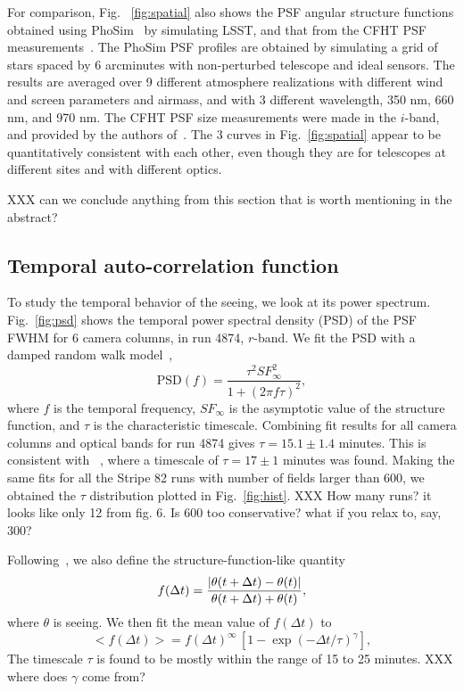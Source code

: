 For comparison, Fig. ~\ref{fig:spatial} also shows the PSF angular
structure functions obtained using PhoSim~\citep{phosim} by simulating LSST,
and that from the CFHT PSF measurements~\citep{heymans2012}.
The PhoSim PSF profiles are obtained by simulating a grid of stars
spaced by 6 arcminutes with non-perturbed telescope and ideal sensors.
The results are averaged over 9 different atmosphere realizations with
different wind and screen parameters and airmass, and with 3 different
wavelength, 350 nm, 660 nm, and 970 nm.
The CFHT PSF size measurements were made in the $i$-band, and provided
by the authors of~\cite{heymans2012}.
The 3 curves in Fig.~\ref{fig:spatial} appear to be quantitatively
consistent with each other, even though they are for telescopes at
different sites and with different optics.

XXX can we conclude anything from this section that is worth mentioning in the abstract? 


\subsection{Temporal auto-correlation function}

To study the temporal behavior of the seeing, we look at its
 power spectrum.
Fig.~\ref{fig:psd} shows the temporal power spectral density (PSD) of the
PSF FWHM for 6 camera columns, in run 4874, $r$-band.
We fit the PSD with a damped random walk model~\citep{zeljkoBook},
\begin{equation}
\textrm{PSD}(f) = \frac{\tau^2 SF^2_{\infty}}{1+(2\pi f \tau)^2},
\end{equation}
where $f$ is the temporal frequency, $SF_{\infty}$ is the asymptotic
value of the structure function, and $\tau$ is the
characteristic timescale.
Combining fit results for all camera columns and optical bands for run 4874
gives $\tau = 15.1 \pm 1.4$ minutes.
This is consistent with ~\cite{Racine1996}, where a timescale of 
$\tau = 17 \pm 1$ minutes was found.
Making the same fits for all the Stripe 82 runs with number of fields
larger than 600, we obtained the $\tau$ distribution plotted in Fig.~\ref{fig:hist}.
XXX How many runs? it looks like only 12 from fig. 6. Is 600 too conservative? 
what if you relax to, say, 300? 

Following~\cite{Racine1996}, we also define the structure-function-like quantity
\begin{equation}
       f(\Delta t) = {| \theta(t+\Delta t) - \theta(t)| \over  \theta(t+\Delta t) + \theta(t) },
\end{equation} 
where $\theta$ is seeing.
We then fit the mean value of $f(\Delta t)$ to 
\begin{equation}
    < f(\Delta t) > =  f(\Delta t) ^\infty \, \left[ 1 - \exp(-\Delta t/\tau)^\gamma \right],
\end{equation} 
The timescale $\tau$ is found to be mostly within the range of 15 to 25 minutes.
XXX where does $\gamma$ come from? 

